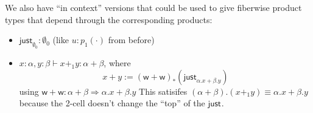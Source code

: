 \documentclass[10pt]{article}
\newcommand\just[1]{\ensuremath{\textsf{just}_{#1}}}
\begin{document}
We also have ``in context'' versions that could be used to give
fiberwise product types that depend through the corresponding products:
\begin{itemize}
\item $\just{\emptyset_0} : \emptyset_0$ (like $u : p_1(\cdot)$ from before)
\item $x : \alpha, y : \beta \vdash x +_1 y : \alpha + \beta$, where 
\[x + y := (\mathsf{w} + \mathsf{w})_* (\just{\alpha.x + \beta.y})
\]
using $\mathsf{w} + \mathsf{w} : \alpha + \beta \Rightarrow {\alpha.x +
  \beta.y}$ This satisifes $(\alpha+\beta).(x +_1 y) \equiv \alpha.x +
\beta.y$ because the 2-cell doesn't change the ``top'' of the \just{}.
\end{itemize}


  

\end{document}
